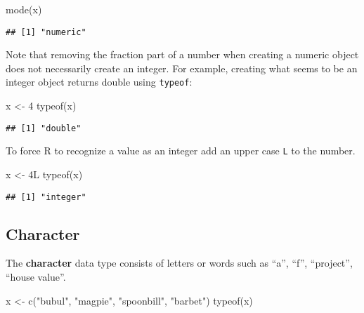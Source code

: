 \documentclass[
]{article}
\newenvironment{Shaded}{\begin{snugshade}}{\end{snugshade}}
\newcommand{\DecValTok}[1]{\textcolor[rgb]{0.00,0.00,0.81}{#1}}
\newcommand{\FunctionTok}[1]{\textcolor[rgb]{0.00,0.00,0.00}{#1}}
\newcommand{\NormalTok}[1]{#1}
\newcommand{\OtherTok}[1]{\textcolor[rgb]{0.56,0.35,0.01}{#1}}
\newcommand{\StringTok}[1]{\textcolor[rgb]{0.31,0.60,0.02}{#1}}
\begin{document}
\begin{Shaded}
\begin{Highlighting}[]
\FunctionTok{mode}\NormalTok{(x)}
\end{Highlighting}
\end{Shaded}

\begin{verbatim}
## [1] "numeric"
\end{verbatim}

Note that removing the fraction part of a number when creating a numeric
object does not necessarily create an integer. For example, creating
what seems to be an integer object returns double using \texttt{typeof}:

\begin{Shaded}
\begin{Highlighting}[]
\NormalTok{x }\OtherTok{\textless{}{-}} \DecValTok{4}
\FunctionTok{typeof}\NormalTok{(x)}
\end{Highlighting}
\end{Shaded}

\begin{verbatim}
## [1] "double"
\end{verbatim}

To force R to recognize a value as an integer add an upper case
\texttt{L} to the number.

\begin{Shaded}
\begin{Highlighting}[]
\NormalTok{x }\OtherTok{\textless{}{-}}\NormalTok{ 4L}
\FunctionTok{typeof}\NormalTok{(x)}
\end{Highlighting}
\end{Shaded}

\begin{verbatim}
## [1] "integer"
\end{verbatim}

\hypertarget{character}{%
\subsection{Character}\label{character}}

The \textbf{character} data type consists of letters or words such as
``a'', ``f'', ``project'', ``house value''.

\begin{Shaded}
\begin{Highlighting}[]
\NormalTok{x }\OtherTok{\textless{}{-}} \FunctionTok{c}\NormalTok{(}\StringTok{"bubul"}\NormalTok{, }\StringTok{"magpie"}\NormalTok{, }\StringTok{"spoonbill"}\NormalTok{, }\StringTok{"barbet"}\NormalTok{)}
\FunctionTok{typeof}\NormalTok{(x)}
\end{Highlighting}
\end{Shaded}
\end{document}
